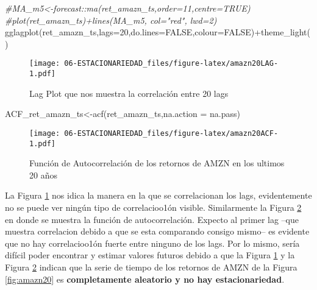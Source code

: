 \documentclass[
]{book}
\newenvironment{Shaded}{\begin{snugshade}}{\end{snugshade}}
\newcommand{\AttributeTok}[1]{\textcolor[rgb]{0.77,0.63,0.00}{#1}}
\newcommand{\CommentTok}[1]{\textcolor[rgb]{0.56,0.35,0.01}{\textit{#1}}}
\newcommand{\ConstantTok}[1]{\textcolor[rgb]{0.00,0.00,0.00}{#1}}
\newcommand{\DecValTok}[1]{\textcolor[rgb]{0.00,0.00,0.81}{#1}}
\newcommand{\FunctionTok}[1]{\textcolor[rgb]{0.00,0.00,0.00}{#1}}
\newcommand{\NormalTok}[1]{#1}
\newcommand{\OtherTok}[1]{\textcolor[rgb]{0.56,0.35,0.01}{#1}}
\newcommand{\SpecialCharTok}[1]{\textcolor[rgb]{0.00,0.00,0.00}{#1}}
\begin{document}
\begin{Shaded}
\begin{Highlighting}[]
\CommentTok{\#MA\_m5\textless{}{-}forecast::ma(ret\_amazn\_ts,order=11,centre=TRUE)}
\CommentTok{\#plot(ret\_amazn\_ts)+lines(MA\_m5, col="red", lwd=2)}
\FunctionTok{gglagplot}\NormalTok{(ret\_amazn\_ts,}\AttributeTok{lags=}\DecValTok{20}\NormalTok{,}\AttributeTok{do.lines=}\ConstantTok{FALSE}\NormalTok{,}\AttributeTok{colour=}\ConstantTok{FALSE}\NormalTok{)}\SpecialCharTok{+}\FunctionTok{theme\_light}\NormalTok{()}
\end{Highlighting}
\end{Shaded}

\begin{figure}
\centering
\texttt{[image: 06-ESTACIONARIEDAD\_files/figure-latex/amazn20LAG-1.pdf]}
\caption{\label{fig:amazn20LAG}Lag Plot que nos muestra la correlación entre 20 lags}
\end{figure}

\begin{Shaded}
\begin{Highlighting}[]
\NormalTok{ACF\_ret\_amazn\_ts}\OtherTok{\textless{}{-}}\FunctionTok{acf}\NormalTok{(ret\_amazn\_ts,}\AttributeTok{na.action =}\NormalTok{ na.pass)}
\end{Highlighting}
\end{Shaded}

\begin{figure}
\centering
\texttt{[image: 06-ESTACIONARIEDAD\_files/figure-latex/amazn20ACF-1.pdf]}
\caption{\label{fig:amazn20ACF}Función de Autocorrelación de los retornos de AMZN en los ultimos 20 años}
\end{figure}

La Figura \ref{fig:amazn20LAG} nos idica la manera en la que se
correlacionan los lags, evidentemente no se puede ver ningún tipo de
correlacioo1ón visible. Similarmente la Figura \ref{fig:amazn20ACF} en
donde se muestra la función de autocorrelación. Expecto al primer lag
--que muestra correlacion debido a que se esta comparando consigo
mismo-- es evidente que no hay correlacioo1ón fuerte entre ninguno de
los lags. Por lo mismo, sería difícil poder encontrar y estimar valores
futuros debido a que la Figura \ref{fig:amazn20LAG} y la Figura
\ref{fig:amazn20ACF} indican que la serie de tiempo de los retornos de
AMZN de la Figura \ref{fig:amazn20} es \textbf{completamente aleatorio y no
hay estacionariedad}.

  
\end{document}
